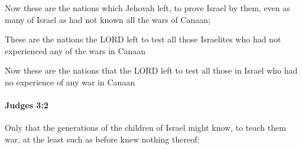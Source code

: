 			\begin{versebox}
					\item[BHS] 
					\item[ASV] Now these are the nations which Jehovah left, to prove Israel by them, even as many of Israel as had not known all the wars of Canaan;
					\item[NIV] These are the nations the LORD left to test all those Israelites who had not experienced any of the wars in Canaan
					\item[NRSV] Now these are the nations that the LORD left to test all those in Israel who had no experience of any war in Canaan
			\end{versebox}

		\paragraph{Judges 3:2} %
			\label{JUDGES-3-2}

			Only that the generations of the children of Israel might know, to teach them war, at the least such as before knew nothing thereof;

